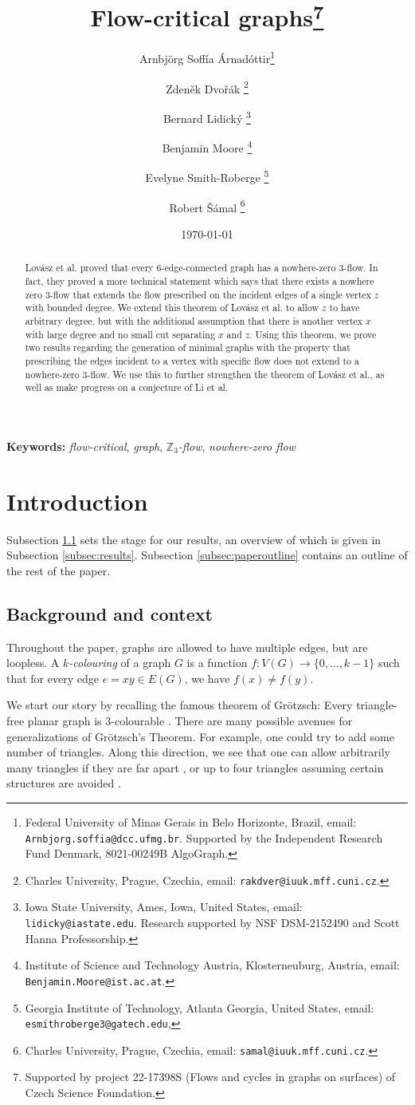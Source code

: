 \documentclass{article}
\title{Flow-critical graphs\thanks{Supported by project 22-17398S (Flows and cycles in graphs on surfaces) of Czech Science Foundation.}}
\author{Arnbjörg Soffía Árnadóttir\thanks{Federal University of Minas Gerais in Belo Horizonte, Brazil, email: \texttt{Arnbjorg.soffia@dcc.ufmg.br}. Supported by the Independent Research Fund Denmark, 8021-00249B AlgoGraph.}\and Zdeněk Dvořák \thanks{Charles University, Prague, Czechia, email: \texttt{rakdver@iuuk.mff.cuni.cz}.} \and Bernard Lidický \thanks{Iowa State University, Ames, Iowa, United States, email: \texttt{lidicky@iastate.edu}. Research supported by NSF DSM-2152490 and Scott Hanna Professorship.} \and Benjamin Moore \thanks{Institute of Science and Technology Austria, Klosterneuburg, Austria, email: \texttt{Benjamin.Moore@ist.ac.at}.} \and Evelyne Smith-Roberge \thanks{Georgia Institute of Technology, Atlanta Georgia, United States, email: \texttt{esmithroberge3@gatech.edu},} \and Robert Šámal \thanks{Charles University, Prague, Czechia, email: \texttt{samal@iuuk.mff.cuni.cz}.}}
\date{\today}
\begin{document}
\maketitle

\textbf{Keywords:} \emph{flow-critical}, \emph{graph}, \emph{$\mathbb{Z}_3$-flow}, \emph{nowhere-zero flow}



\begin{abstract}
 Lov\'{a}sz et al. proved that every $6$-edge-connected graph has a nowhere-zero $3$-flow. In fact, they proved a more technical statement which says that there exists a nowhere zero $3$-flow that extends the flow prescribed on the incident edges of a single vertex $z$ with bounded degree. We extend this theorem of Lov\'{a}sz et al. to  allow $z$ to have arbitrary degree, but with the additional assumption that there is another vertex $x$ with large degree and no small cut separating  $x$ and $z$. Using this theorem, we prove two results regarding the generation of minimal graphs with the property that prescribing the edges incident to a vertex with specific flow does not extend to a nowhere-zero $3$-flow. We use this to further strengthen the theorem of Lov\'{a}sz et al., as well as make progress on a conjecture of Li et al. 
\end{abstract}

\tableofcontents

\section{Introduction}
Subsection \ref{subsec:background} sets the stage for our results, an overview of which is given in Subsection \ref{subsec:results}. Subsection \ref{subsec:paperoutline} contains an outline of the rest of the paper.

\subsection{Background and context}\label{subsec:background}
Throughout the paper, graphs are allowed to have multiple edges, but are
loopless.  A \emph{$k$-colouring} of a graph $G$ is a function $f:V(G)
\rightarrow \{0,\ldots,k-1\}$ such that for every edge $e =xy \in E(G)$, we
have $f(x) \neq f(y)$.

We start our story by recalling the famous theorem of
Grötzsch: Every triangle-free planar graph is $3$-colourable
\cite{grotzsch1959}. There are many possible avenues for generalizations of
Grötzsch's Theorem. For example, one could try to add some number of triangles.
Along this direction, we see that one can allow arbitrarily many triangles if
they are far apart \cite{havelpaper}, or up to four triangles assuming certain
structures are avoided \cite{fourtriangles}.
\end{document}
